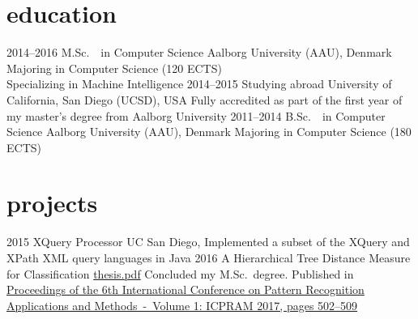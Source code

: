 \documentclass{afriggeri-cv/friggeri-cv}
\newcommand{\aau}{%
  Aalborg University (AAU), Denmark
}
\begin{document}
\section{education}

\begin{entrylist}
  \entry%
    {2014--2016}
    {M.Sc.\ {\normalfont\ in Computer Science}}
    {\aau}
    {Majoring in Computer Science (120 ECTS)\\
    Specializing in Machine Intelligence}
  \entry%
    {2014--2015}
    {Studying abroad}
    {University of California, San Diego (UCSD), USA}
    {Fully accredited as part of the first year of my master's degree from Aalborg University}
  \entry%
    {2011--2014}
    {B.Sc.\ {\normalfont\ in Computer Science}}
    {\aau}
    {Majoring in Computer Science (180 ECTS)}
\end{entrylist}

\section{projects}
\begin{entrylist}
  \entry%
    {2015}
    {XQuery Processor}
    {UC San Diego, }
    {Implemented a subset of the XQuery and XPath XML query languages in Java}
  \entry%
    {2016}
    {A Hierarchical Tree Distance Measure for Classification}
    {\href{https://martinbjeldbak.com/thesis.pdf}{thesis.pdf}}
    {Concluded my M.Sc.\ degree. Published in \href{https://www.scitepress.org/Papers/2017/61985/}{Proceedings of the 6th International Conference on Pattern Recognition Applications and Methods~-~Volume 1: ICPRAM 2017, pages 502--509}}
\end{entrylist}
\end{document}
